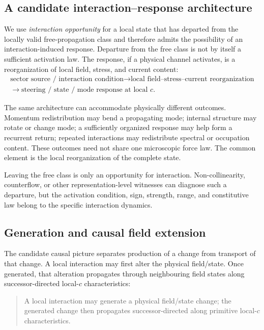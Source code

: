 \documentclass[11pt]{article}
\theoremstyle{definition}
\begin{document}
\subsection{A candidate interaction--response architecture}
\label{subsec:interaction_response}

We use \emph{interaction opportunity} for a local state that has departed from the
locally valid free-propagation class and therefore admits the possibility of an
interaction-induced response.  Departure from the free class is not by itself a
sufficient activation law.  The response, if a physical
channel activates, is a reorganization of local field, stress, and current content:
\begin{equation}
\boxed{
\begin{gathered}
\text{sector source / interaction condition}
\longrightarrow
\text{local field--stress--current reorganization}\\
\longrightarrow
\text{steering / state / mode response at local }c.
\end{gathered}}
\label{eq:response_architecture}
\end{equation}

The same architecture can accommodate physically different outcomes.  Momentum
redistribution may bend a propagating mode; internal structure may rotate or change
mode; a sufficiently organized response may help form a recurrent return; repeated
interactions may redistribute spectral or occupation content.  These outcomes need not
share one microscopic force law.  The common element is the local reorganization of the
complete state.

Leaving the free class is only an opportunity for interaction.  Non-collinearity,
counterflow, or other representation-level witnesses can diagnose such a departure, but
the activation condition, sign, strength, range, and constitutive law belong to the
specific interaction dynamics.

\subsection{Generation and causal field extension}
\label{subsec:causal_propagation}

The candidate causal picture separates production of a change from transport of that
change.  A local interaction may first alter the physical field/state.  Once generated,
that alteration propagates through neighbouring field states along successor-directed
local-$c$ characteristics:
\begin{quote}
A local interaction may generate a physical field/state change; the generated change
then propagates successor-directed along primitive local-$c$ characteristics.
\end{quote}
\end{document}
